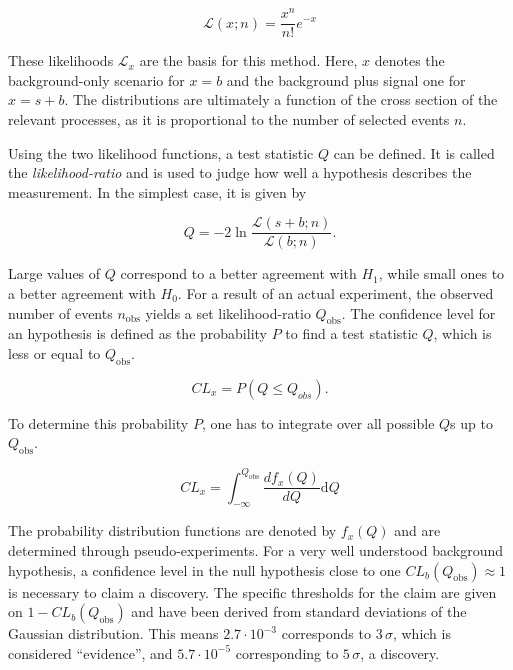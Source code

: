 \begin{equation}
  \label{eq:poisson-likelihood}
    \mathcal{L} (x; n) = \frac{x^n}{n!} e^{-x}
\end{equation}

\noindent These likelihoods $\mathcal{L}_x$ are the basis for this method. Here, $x$ denotes the background-only scenario for $x = b$ and the background plus signal one for $x = s + b$. The distributions are ultimately a function of the cross section of the relevant processes, as it is proportional to the number of selected events $n$.

Using the two likelihood functions, a test statistic $Q$ can be defined. It is called the \textit{likelihood-ratio} and is used to judge how well a hypothesis describes the measurement. In the simplest case, it is given by

\begin{equation}
  \label{eq:testq}
  Q = -2 \ln{ \frac{\mathcal{L} (s + b; n)}{\mathcal{L} (b; n)} }.
\end{equation}

\noindent Large values of $Q$ correspond to a better agreement with $H_1$, while small ones to a better agreement with $H_0$. For a result of an actual experiment, the observed number of events $n_{\text{obs}}$ yields a set likelihood-ratio $Q_{\text{obs}}$. The confidence level for an hypothesis is defined as the probability $P$ to find a test statistic $Q$, which is less or equal to $Q_{\text{obs}}$. 

\begin{equation}
  \label{eq:cl-prob}
  CL_x = P (Q \leq Q_{obs}).
\end{equation}

To determine this probability $P$, one has to integrate over all possible $Q$s up to $Q_{\text{obs}}$.

\begin{equation}
  \label{eq:clx}
  CL_x = \int^{Q_{\text{obs}}}_{-\infty} \frac{d f_x(Q)}{d Q} \text{d} Q
\end{equation}

\noindent The probability distribution functions are denoted by $f_x(Q)$ and are determined through pseudo-experiments. For a very well understood background hypothesis, a confidence level in the null hypothesis close to one $CL_b (Q_{\text{obs}}) \approx 1$ is necessary to claim a discovery. The specific thresholds for the claim are given on $1 - CL_b (Q_{\text{obs}})$ and have been derived from standard deviations of the Gaussian distribution. This means $2.7 \cdot 10^{-3}$ corresponds to $3\,\sigma$, which is considered ``evidence'', and $5.7 \cdot 10^{-5}$ corresponding to $5\,\sigma$, a discovery.

